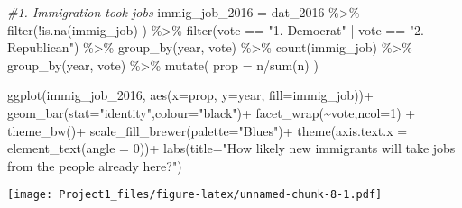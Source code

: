 \documentclass[
]{article}
\newenvironment{Shaded}{\begin{snugshade}}{\end{snugshade}}
\newcommand{\AttributeTok}[1]{\textcolor[rgb]{0.77,0.63,0.00}{#1}}
\newcommand{\CommentTok}[1]{\textcolor[rgb]{0.56,0.35,0.01}{\textit{#1}}}
\newcommand{\DecValTok}[1]{\textcolor[rgb]{0.00,0.00,0.81}{#1}}
\newcommand{\FunctionTok}[1]{\textcolor[rgb]{0.00,0.00,0.00}{#1}}
\newcommand{\NormalTok}[1]{#1}
\newcommand{\OtherTok}[1]{\textcolor[rgb]{0.56,0.35,0.01}{#1}}
\newcommand{\SpecialCharTok}[1]{\textcolor[rgb]{0.00,0.00,0.00}{#1}}
\newcommand{\StringTok}[1]{\textcolor[rgb]{0.31,0.60,0.02}{#1}}
\begin{document}
\begin{Shaded}
\begin{Highlighting}[]
\CommentTok{\#1. Immigration took jobs}
\NormalTok{immig\_job\_2016 }\OtherTok{=}\NormalTok{ dat\_2016 }\SpecialCharTok{\%\textgreater{}\%}
  \FunctionTok{filter}\NormalTok{(}\SpecialCharTok{!}\FunctionTok{is.na}\NormalTok{(immig\_job) ) }\SpecialCharTok{\%\textgreater{}\%}
  \FunctionTok{filter}\NormalTok{(vote }\SpecialCharTok{==} \StringTok{"1. Democrat"} \SpecialCharTok{|}\NormalTok{ vote }\SpecialCharTok{==} \StringTok{"2. Republican"}\NormalTok{) }\SpecialCharTok{\%\textgreater{}\%}
  \FunctionTok{group\_by}\NormalTok{(year, vote) }\SpecialCharTok{\%\textgreater{}\%}
  \FunctionTok{count}\NormalTok{(immig\_job) }\SpecialCharTok{\%\textgreater{}\%}
  \FunctionTok{group\_by}\NormalTok{(year, vote) }\SpecialCharTok{\%\textgreater{}\%}
  \FunctionTok{mutate}\NormalTok{(}
    \AttributeTok{prop =}\NormalTok{ n}\SpecialCharTok{/}\FunctionTok{sum}\NormalTok{(n)}
\NormalTok{  )}


\FunctionTok{ggplot}\NormalTok{(immig\_job\_2016,}
       \FunctionTok{aes}\NormalTok{(}\AttributeTok{x=}\NormalTok{prop, }\AttributeTok{y=}\NormalTok{year, }\AttributeTok{fill=}\NormalTok{immig\_job))}\SpecialCharTok{+}
  \FunctionTok{geom\_bar}\NormalTok{(}\AttributeTok{stat=}\StringTok{"identity"}\NormalTok{,}\AttributeTok{colour=}\StringTok{"black"}\NormalTok{)}\SpecialCharTok{+}
  \FunctionTok{facet\_wrap}\NormalTok{(}\SpecialCharTok{\textasciitilde{}}\NormalTok{vote,}\AttributeTok{ncol=}\DecValTok{1}\NormalTok{) }\SpecialCharTok{+}
  \FunctionTok{theme\_bw}\NormalTok{()}\SpecialCharTok{+}
  \FunctionTok{scale\_fill\_brewer}\NormalTok{(}\AttributeTok{palette=}\StringTok{"Blues"}\NormalTok{)}\SpecialCharTok{+}
  \FunctionTok{theme}\NormalTok{(}\AttributeTok{axis.text.x =} \FunctionTok{element\_text}\NormalTok{(}\AttributeTok{angle =} \DecValTok{0}\NormalTok{))}\SpecialCharTok{+}
  \FunctionTok{labs}\NormalTok{(}\AttributeTok{title=}\StringTok{"How likely new immigrants will take jobs from the people already here?"}\NormalTok{)}
\end{Highlighting}
\end{Shaded}

\texttt{[image: Project1\_files/figure-latex/unnamed-chunk-8-1.pdf]}
\end{document}
